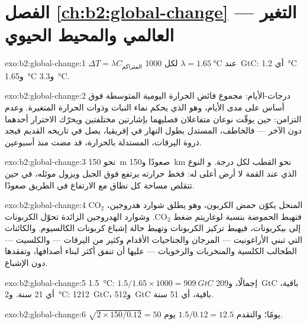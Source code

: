 \section*{الفصل \ref{ch:b2:global-change} --- التغير العالمي والمحيط الحيوي}

\begin{solution}{exo:b2:global-change:1}
$\Delta T = \lambda C_{\text{المتراكم}}$ عند $\lambda = \qty{1.65}{\celsius}$
لكل \qty{1000}{GtC}: أي \qty{1.2}{\celsius} و\qty{1.65}{\celsius}
و\qty{3.3}{\celsius}.
\end{solution}

\begin{solution}{exo:b2:global-change:2}
درجات-الأيام: مجموع فائض الحرارة اليومية المتوسطة
فوق أساس على مدى الأيام، وهو  الذي يحكم
نماء النبات وذوات الحرارة المتغيرة. وعدم التزامن: حين يوقّت نوعان
متفاعلان فصليهما بإشارتين مختلفتين ويحرّك
الاحترار أحدهما دون الآخر --- فالخاطف، المستدل بطول
النهار في إفريقيا، يصل في تاريخه القديم فيجد ذروة
اليرقات، المستدلة بالحرارة، قد مضت منذ أسبوعين.
\end{solution}

\begin{solution}{exo:b2:global-change:3}
نحو \qty{150}{m} صعودًا و\qty{150}{km} نحو القطب لكل درجة. و
النوع الذي عند القمة لا أرض أعلى له: فخط حرارته يرتفع
فوق الجبل ويزول موئله، في حين تتقلص مساحة
كل نطاق مع الارتفاع في الطريق صعودًا.
\end{solution}

\begin{solution}{exo:b2:global-change:4}
\ensuremath{\mathrm{CO_2}} المنحل يكوّن حمض الكربون، وهو
يطلق شوارد هدروجين، فتهبط الحموضة بنسبة
لوغاريتم ضغط \ensuremath{\mathrm{CO_2}}. وشوارد
الهدروجين الزائدة تحوّل الكربونات إلى بيكربونات، فيهبط تركيز
الكربونات وتهبط حالة إشباع كربونات الكالسيوم.
والكائنات التي تبني الأراغونيت --- المرجان والجناحيات الأقدام وكثير من اليرقات
--- والكلسيت --- الطحالب الكلسية والمنخربات والرخويات ---
عليها أن تنفق أكثر لبناء أصدافها، وتفقدها دون الإشباع.
\end{solution}

\begin{solution}{exo:b2:global-change:5}
\qty{1.5}{\celsius}: $1.5/1.65\times 1000 = \qty{909}{GtC}$ إجمالًا،
و\qty{209}{GtC} باقية، أي 21 سنة. و\qty{2}{\celsius}:
\qty{1212}{GtC}، و\qty{512}{GtC} باقية، أي 51 سنة.
\end{solution}

\begin{solution}{exo:b2:global-change:6}
$\sqrt{2\times 150/0.12} = 50$ يومًا؛ والتقدم $1.5/0.12 = 12.5$
يوم.
\end{solution}

